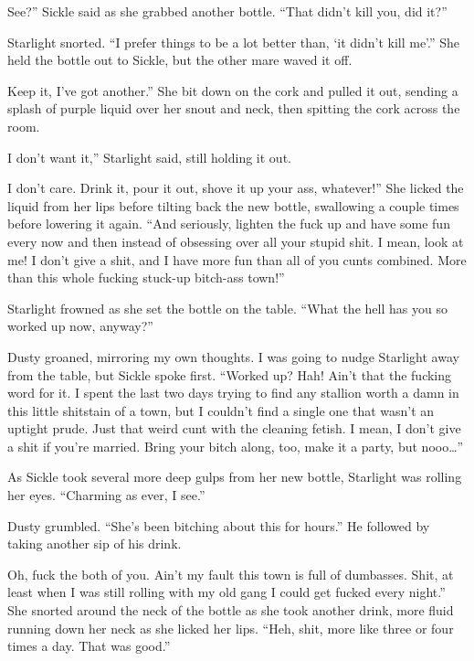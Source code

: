 \leavevmode{}See?” Sickle said as she grabbed another bottle. “That didn’t kill you, did it?”

Starlight snorted. “I prefer things to be a lot better than, ‘it didn’t kill me’.” She held the bottle out to Sickle, but the other mare waved it off.

\leavevmode{}Keep it, I’ve got another.” She bit down on the cork and pulled it out, sending a splash of purple liquid over her snout and neck, then spitting the cork across the room.

\leavevmode{}I don’t want it,” Starlight said, still holding it out.

\leavevmode{}I don’t care. Drink it, pour it out, shove it up your ass, whatever!” She licked the liquid from her lips before tilting back the new bottle, swallowing a couple times before lowering it again. “And seriously, lighten the fuck up and have some fun every now and then instead of obsessing over all your stupid shit. I mean, look at me! I don’t give a shit, and I have more fun than all of you cunts combined. More than this whole fucking stuck-up bitch-ass town!”

Starlight frowned as she set the bottle on the table. “What the hell has you so worked up now, anyway?”

Dusty groaned, mirroring my own thoughts. I was going to nudge Starlight away from the table, but Sickle spoke first. “Worked up? Hah! Ain’t that the fucking word for it. I spent the last two days trying to find any stallion worth a damn in this little shitstain of a town, but I couldn’t find a single one that wasn’t an uptight prude. Just that weird cunt with the cleaning fetish. I mean, I don’t give a shit if you’re married. Bring your bitch along, too, make it a party, but nooo…”

As Sickle took several more deep gulps from her new bottle, Starlight was rolling her eyes. “Charming as ever, I see.”

Dusty grumbled. “She’s been bitching about this for hours.” He followed by taking another sip of his drink.

\leavevmode{}Oh, fuck the both of you. Ain’t my fault this town is full of dumbasses. Shit, at least when I was still rolling with my old gang I could get fucked every night.” She snorted around the neck of the bottle as she took another drink, more fluid running down her neck as she licked her lips. “Heh, shit, more like three or four times a day. That was good.”

